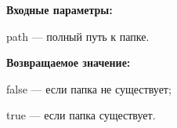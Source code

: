 \textbf{Входные параметры:}

path --- полный путь к папке.

\textbf{Возвращаемое значение:}

false --- если папка не существует;

true --- если папка существует.